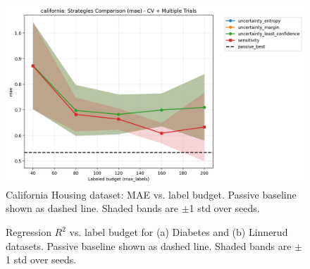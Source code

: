 \documentclass[conference]{IEEEtran}
\begin{document}
\begin{figure}[t]
\centering
\includegraphics[width=0.95\columnwidth]{figures/reg_california_comparison_mae.png}
\caption{California Housing dataset: MAE vs. label budget. Passive baseline shown as dashed line. Shaded bands are $\pm$1 std over seeds.}
\label{fig:california-mae-compare}
\end{figure}

\begin{figure}[t]
\centering
{}
\hfill
{}
\caption{Regression $R^2$ vs. label budget for (a) Diabetes and (b) Linnerud datasets. Passive baseline shown as dashed line. Shaded bands are $\pm$1 std over seeds.}
\label{fig:reg-r2-compare}
\end{figure}
\end{document}
